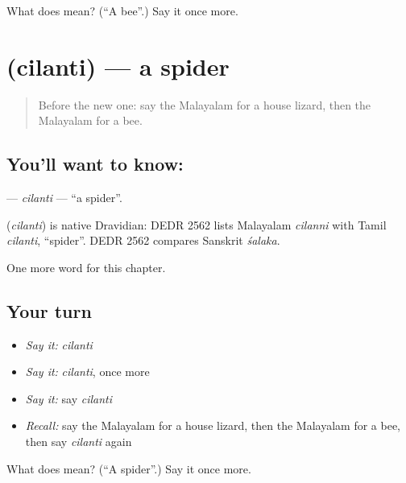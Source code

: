 \begin{tcolorbox}[breakable,colback=teal!4,colframe=teal!35!black,title={Before you move on}]
What does  mean? (\textquotedblleft{}A bee\textquotedblright{}.) Say it once more.
\end{tcolorbox}
\section[\texorpdfstring{\ml{ചിലന്തി} (cilanti)}{ചിലന്തി (cilanti)}]{ (cilanti) — a spider}

\label{lesson:ML-C327-cilanti}



\begin{quote}
Before the new one: say the Malayalam for a house lizard, then the Malayalam for a bee.
\end{quote}

\subsection*{You'll want to know: }
\textbf{} — \emph{cilanti} — \textquotedblleft{}a spider\textquotedblright{}.

\begin{cousinweb}
\textbf{} (\emph{cilanti}) is native Dravidian: DEDR 2562 lists Malayalam \emph{cilanni} with Tamil \emph{cilanti}, \textquotedblleft{}spider\textquotedblright{}. DEDR 2562 compares Sanskrit \emph{śalaka}.
\end{cousinweb}

\begin{grammarlens}[title={What you've built}]
One more word for this chapter.
\end{grammarlens}

\subsection*{Your turn}
\begin{itemize}
\raggedright
  \item \emph{Say it:} \emph{cilanti}
  \item \emph{Say it:} \emph{cilanti}, once more
  \item \emph{Say it:} say \emph{cilanti}
  \item \emph{Recall:} say the Malayalam for a house lizard, then the Malayalam for a bee, then say \emph{cilanti} again
\end{itemize}

\begin{tcolorbox}[breakable,colback=teal!4,colframe=teal!35!black,title={Before you move on}]
What does  mean? (\textquotedblleft{}A spider\textquotedblright{}.) Say it once more.
\end{tcolorbox}

